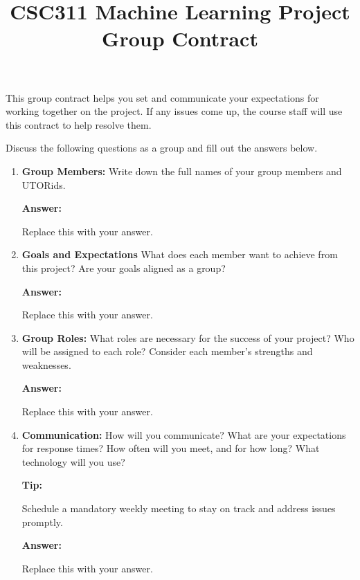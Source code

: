 \documentclass[12pt]{article}
\title{CSC311 Machine Learning Project Group Contract}
\author{}
\date{}
\newenvironment{answer}[1][]{
  \color{blue}\textbf{Answer:}
}{}
\newenvironment{alice}[1][]{
  \color{black}\textbf{Tip:}
}{}
\begin{document}
\maketitle

This group contract helps you set and communicate your expectations for working together on the project. If any issues come up, the course staff will use this contract to help resolve them.

Discuss the following questions as a group and fill out the answers below.

\begin{enumerate}
\item {\bf Group Members:} Write down the full names of your group members and UTORids.

\begin{answer}

Replace this with your answer.
\end{answer}

\item {\bf Goals and Expectations} What does each member want to achieve from this project? Are your goals aligned as a group?

\begin{answer}

Replace this with your answer.
\end{answer}

\item {\bf Group Roles:} What roles are necessary for the success of your project? Who will be assigned to each role? Consider each member’s strengths and weaknesses.

\begin{answer}

Replace this with your answer.

\end{answer}

\item {\bf Communication:} How will you communicate? What are your expectations for response times? How often will you meet, and for how long? What technology will you use?

\begin{alice}

Schedule a mandatory weekly meeting to stay on track and address issues promptly.
\end{alice}

\begin{answer}

Replace this with your answer.


\end{answer}
\end{enumerate}
\end{document}
